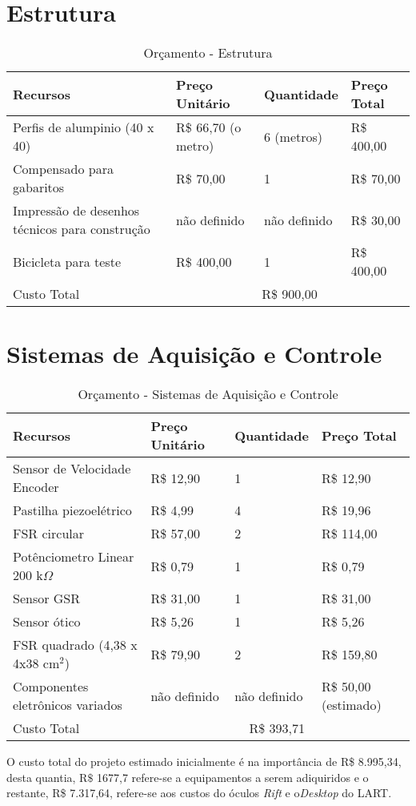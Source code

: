 \section{Estrutura}

\begin{table}[htp]
\centering
\caption{Orçamento - Estrutura}
\label{orcamento}
\begin{tabular}{|p{6cm}|l|l|l|}
\hline
Recursos                 & Preço Unitário & Quantidade & Preço Total   \\ 
\hline
Perfis de alumpinio (40 x 40)       & R\$ 66,70 (o metro)   & 6 (metros)        & R\$ 400,00 \\ 
Compensado para gabaritos       & R\$ 70,00   & 1        & R\$ 70,00\\ 
Impressão de desenhos técnicos para construção     & não definido   & não definido        & R\$ 30,00\\ 
Bicicleta para teste    & R\$ 400,00   & 1        & R\$ 400,00\\ 
\hline
Custo Total &  \multicolumn{3}{|c|}{R\$ 900,00 }     \\ 

\hline
\end{tabular}
\end{table}

\section{Sistemas de Aquisição e Controle}

\begin{table}[H]
\centering
\caption{Orçamento - Sistemas de Aquisição e Controle}
\label{orcamento}
\begin{tabular}{|p{6cm}|l|l|l|}
\hline
Recursos                 & Preço Unitário & Quantidade & Preço Total   \\ 
\hline
Sensor de Velocidade Encoder       & R\$ 12,90   & 1        & R\$ 12,90\\ 
Pastilha piezoelétrico      & R\$ 4,99   & 4        & R\$ 19,96\\ 
FSR circular     & R\$ 57,00  & 2        & R\$ 114,00\\ 
Potênciometro Linear 200 k$\Omega$   & R\$ 0,79   & 1        & R\$ 0,79\\ 

Sensor GSR  & R\$ 31,00   & 1        & R\$ 31,00\\ 

Sensor ótico   & R\$ 5,26   & 1        & R\$ 5,26\\ 

FSR quadrado (4,38 x 4x38 cm$^2$)   & R\$ 79,90   & 2        & R\$ 159,80\\ 

Componentes eletrônicos variados  & não definido   & não definido        & R\$ 50,00 (estimado)\\ 
\hline
Custo Total &  \multicolumn{3}{|c|}{R\$ 393,71  }     \\ 

\hline
\end{tabular}
\end{table}

	O custo total do projeto estimado inicialmente é na importância de R\$ 8.995,34, desta quantia, R$\$$ 1677,7 refere-se a equipamentos a serem adiquiridos e o restante, R\$ 7.317,64, refere-se aos custos do óculos \textit{Rift} e o\textit{Desktop} do LART.